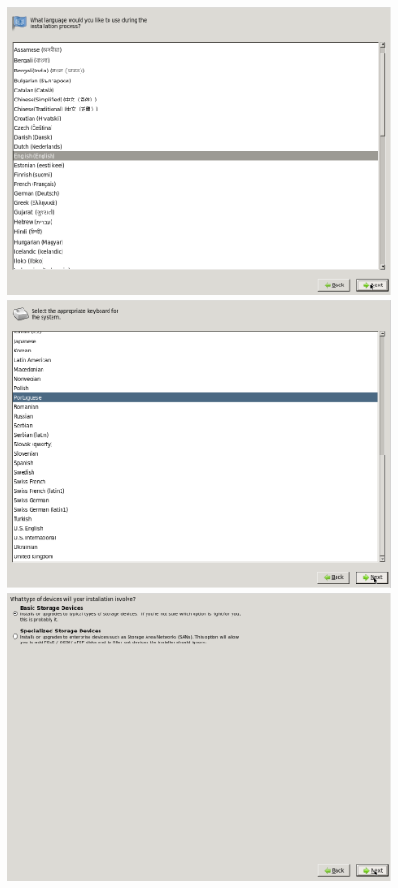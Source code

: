 \begin{figure}[H]
	\begin{center}
	\includegraphics[scale=0.2]{screenshots/install/nuxis/wizard_install_02.png}
	\includegraphics[scale=0.2]{screenshots/install/nuxis/wizard_install_03.png}
	\includegraphics[scale=0.2]{screenshots/install/nuxis/wizard_install_04.png}

\end{center}
\end{figure}
